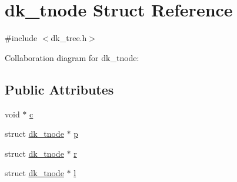 \hypertarget{structdk__tnode}{\section{dk\+\_\+tnode Struct Reference}
\label{structdk__tnode}
}


{\ttfamily \#include $<$dk\+\_\+tree.\+h$>$}



Collaboration diagram for dk\+\_\+tnode\+:
\subsection*{Public Attributes}
\begin{DoxyCompactItemize}
\item 
void $\ast$ \hyperlink{structdk__tnode_a4d8427a1419ca15308105dae0621c2bf}{c}
\item 
struct \hyperlink{structdk__tnode}{dk\+\_\+tnode} $\ast$ \hyperlink{structdk__tnode_a3a3fdb7d00634c393fad557eb15f0166}{p}
\item 
struct \hyperlink{structdk__tnode}{dk\+\_\+tnode} $\ast$ \hyperlink{structdk__tnode_a13392f297542ba6ec06da4e389ef3d7f}{r}
\item 
struct \hyperlink{structdk__tnode}{dk\+\_\+tnode} $\ast$ \hyperlink{structdk__tnode_acf718a20eaecd8c363ef2f70742013a5}{l}
\end{DoxyCompactItemize}


